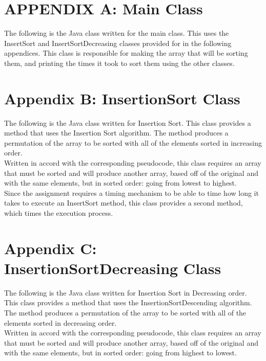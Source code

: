 \documentclass[12pt]{article}
\begin{document}
\section*{APPENDIX A: Main Class}
The following is the Java class written for the main class. This uses the InsertSort and InsertSortDecreasing classes provided for in the following appendices. This class is responsible for making the array that will be sorting them, and printing the times it took to sort them using the other classes.

\hrulefill 

\pagebreak

\section*{Appendix B: InsertionSort Class}

The following is the Java class written for Insertion Sort. This class provides a method that uses the Insertion Sort algorithm. The method produces a permutation of the array to be sorted with all of the elements sorted in increasing order. \\

Written in accord with the corresponding pseudocode, this class requires an array that must be sorted and will produce another array, based off of the original and with the same elements, but in sorted order: going from lowest to highest. \\

Since the assignment requires a timing mechanism to be able to time how long it takes to execute an InsertSort method, this class provides a second method, which times the execution process. 

\hrulefill 

\pagebreak

\section*{Appendix C: InsertionSortDecreasing Class}

The following is the Java class written for Insertion Sort in Decreasing order. This class provides a method that uses the InsertionSortDescending algorithm. The method produces a permutation of the array to be sorted with all of the elements sorted in decreasing order. \\

Written in accord with the corresponding pseudocode, this class requires an array that must be sorted and will produce another array, based off of the original and with the same elements, but in sorted order: going from highest to lowest. \\
 
\end{document}

